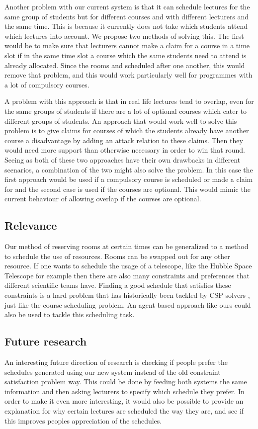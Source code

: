 Another problem with our current system is that it can schedule lectures
for the same group of students but for different courses and with
different lecturers and the same time. This is because it currently does
not take which students attend which lectures into account. We propose two
methods of solving this. The first would be to make sure that lecturers
cannot make a claim for a course in a time slot if in the same time slot a
course which the same students need to attend is already allocated. Since
the rooms and scheduled after one another, this would remove that problem,
and this would work particularly well for programmes with a lot of
compulsory courses. 

A problem with this approach is that in real life lectures tend to overlap,
even for the same groups of students if there are a lot of optional courses
which cater to different groups of students. An approach that would work
well to solve this problem is to give claims for courses of which the
students already have another course a disadvantage by adding an attack
relation to these claims. Then they would need more support than otherwise
necessary in order to win that round. Seeing as both of these two
approaches have their own drawbacks in different scenarios, a combination
of the two might also solve the problem.  In this case the first approach
would be used if a compulsory course is scheduled or made a claim for and
the second case is used if the courses are optional. This would mimic the
current behaviour of allowing overlap if the courses are optional.

\subsection{Relevance}
Our method of reserving rooms at certain times can be generalized to a method to
schedule the use of resources. Rooms can be swapped out for any other resource.
If one wants to schedule the usage of a telescope, like the Hubble Space
Telescope for example then there are also many constraints and preferences that
different scientific teams have. Finding a good schedule that satisfies these
constraints is a hard problem that has historically been tackled by CSP solvers
\cite{johnston1994spike}, just like the course scheduling problem. An agent
based approach like ours could also be used to tackle this scheduling task.

\subsection{Future research}
An interesting future direction of research is checking if people prefer
the schedules generated using our new system instead of the old constraint
satisfaction problem way. This could be done by feeding both systems
the same information and then asking lecturers to specify which schedule
they prefer. In order to make it even more interesting, it would also be
possible to provide an explanation for why certain lectures are scheduled
the way they are, and see if this improves peoples appreciation of the
schedules.

